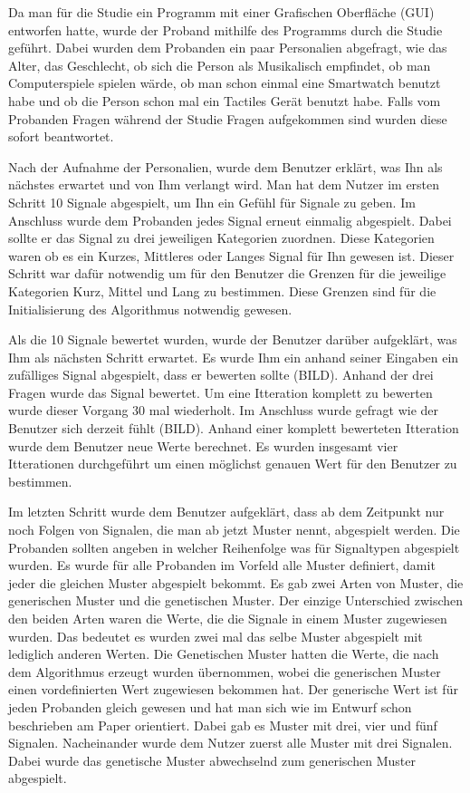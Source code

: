 Da man f{\"u}r die Studie ein Programm mit einer Grafischen Oberfl{\"a}che (GUI) entworfen hatte, wurde der Proband mithilfe des Programms durch die Studie gef{\"u}hrt.
Dabei wurden dem Probanden ein paar Personalien abgefragt, wie das Alter, das Geschlecht, ob sich die Person als Musikalisch empfindet, ob man Computerspiele spielen w{\"a}rde, ob man schon einmal eine Smartwatch benutzt habe und ob die Person schon mal ein Tactiles Ger{\"a}t benutzt habe. Falls vom Probanden Fragen w{\"a}hrend der Studie Fragen aufgekommen sind wurden diese sofort beantwortet. 

Nach der Aufnahme der Personalien, wurde dem Benutzer erkl{\"a}rt, was Ihn als n{\"a}chstes erwartet und von Ihm verlangt wird. 
Man hat dem Nutzer im ersten Schritt 10 Signale abgespielt, um Ihn ein Gef{\"u}hl f{\"u}r Signale zu geben. Im Anschluss wurde dem Probanden jedes Signal erneut einmalig abgespielt. Dabei sollte er das Signal zu drei jeweiligen Kategorien zuordnen. Diese Kategorien waren ob es ein Kurzes, Mittleres oder Langes Signal f{\"u}r Ihn gewesen ist. Dieser Schritt war daf{\"u}r notwendig um f{\"u}r den Benutzer die Grenzen f{\"u}r die jeweilige Kategorien Kurz, Mittel und Lang zu bestimmen. 
Diese Grenzen sind f{\"u}r die Initialisierung des Algorithmus notwendig gewesen. 

Als die 10 Signale bewertet wurden, wurde der Benutzer dar{\"u}ber aufgekl{\"a}rt, was Ihm als n{\"a}chsten Schritt erwartet. Es wurde Ihm ein anhand seiner Eingaben ein zuf{\"a}lliges Signal abgespielt, dass er bewerten sollte (BILD). Anhand der drei Fragen wurde das Signal bewertet. Um eine Itteration komplett zu bewerten wurde dieser Vorgang 30 mal wiederholt. Im Anschluss wurde gefragt wie der Benutzer sich derzeit f{\"u}hlt (BILD). Anhand einer komplett bewerteten Itteration wurde dem Benutzer neue Werte berechnet. Es wurden insgesamt vier Itterationen durchgef{\"u}hrt um einen m{\"o}glichst genauen Wert f{\"u}r den Benutzer zu bestimmen.

Im letzten Schritt wurde dem Benutzer aufgekl{\"a}rt, dass ab dem Zeitpunkt nur noch Folgen von Signalen, die man ab jetzt Muster nennt, abgespielt werden. Die Probanden sollten angeben in welcher Reihenfolge was f{\"u}r Signaltypen abgespielt wurden. Es wurde f{\"u}r alle Probanden im Vorfeld alle Muster definiert, damit jeder die gleichen Muster abgespielt bekommt. Es gab zwei Arten von Muster, die generischen Muster und die genetischen Muster. Der einzige Unterschied zwischen den beiden Arten waren die Werte, die die Signale in einem Muster zugewiesen wurden. Das bedeutet es wurden zwei mal das selbe Muster abgespielt mit lediglich anderen Werten. Die Genetischen Muster hatten die Werte, die nach dem Algorithmus erzeugt wurden {\"u}bernommen, wobei die generischen Muster einen vordefinierten Wert zugewiesen bekommen hat. Der generische Wert ist f{\"u}r jeden Probanden gleich gewesen und hat man sich wie im Entwurf schon beschrieben am Paper \cite{pescara2016ruttelflug} orientiert.
Dabei gab es Muster mit drei, vier und f{\"u}nf Signalen. Nacheinander wurde dem Nutzer zuerst alle Muster mit drei Signalen. Dabei wurde das genetische Muster abwechselnd zum generischen Muster abgespielt. 

